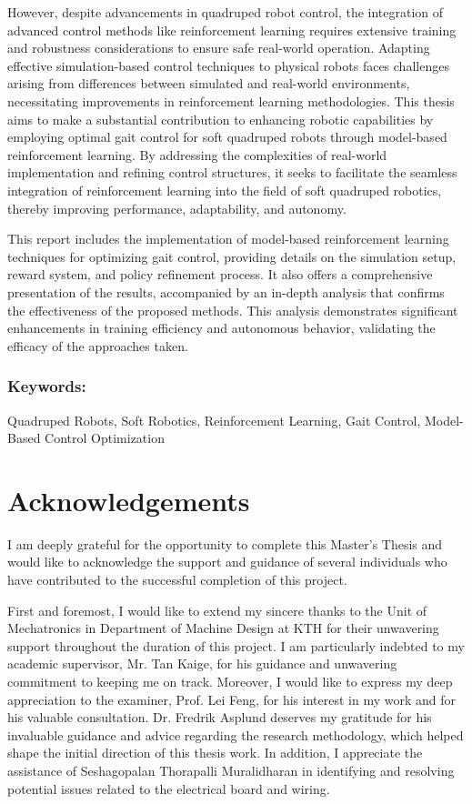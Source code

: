 However, despite advancements in quadruped robot control, the integration of advanced control methods like reinforcement learning requires extensive training and robustness considerations to ensure safe real-world operation. Adapting effective simulation-based control techniques to physical robots faces challenges arising from differences between simulated and real-world environments, necessitating improvements in reinforcement learning methodologies. This thesis aims to make a substantial contribution to enhancing robotic capabilities by employing optimal gait control for soft quadruped robots through model-based reinforcement learning. By addressing the complexities of real-world implementation and refining control structures, it seeks to facilitate the seamless integration of reinforcement learning into the field of soft quadruped robotics, thereby improving performance, adaptability, and autonomy.

This report includes the implementation of model-based reinforcement learning techniques for optimizing gait control, providing details on the simulation setup, reward system, and policy refinement process. It also offers a comprehensive presentation of the results, accompanied by an in-depth analysis that confirms the effectiveness of the proposed methods. This analysis demonstrates significant enhancements in training efficiency and autonomous behavior, validating the efficacy of the approaches taken.

\vspace{2ex}
\subsection*{Keywords:}
Quadruped Robots, Soft Robotics, Reinforcement Learning, Gait Control, Model-Based Control Optimization




\newpage
\chapter*{Acknowledgements}
I am deeply grateful for the opportunity to complete this Master's Thesis and would like to acknowledge the support and guidance of several individuals who have contributed to the successful completion of this project.

First and foremost, I would like to extend my sincere thanks to the Unit of Mechatronics in Department of Machine Design at KTH for their unwavering support throughout the duration of this project. I am particularly indebted to my academic supervisor, Mr. Tan Kaige, for his guidance and unwavering commitment to keeping me on track. Moreover, I would like to express my deep appreciation to the examiner, Prof. Lei Feng, for his interest in my work and for his valuable consultation. Dr. Fredrik Asplund deserves my gratitude for his invaluable guidance and advice regarding the research methodology, which helped shape the initial direction of this thesis work. In addition, I appreciate the assistance of Seshagopalan Thorapalli Muralidharan in identifying and resolving potential issues related to the electrical board and wiring. 

